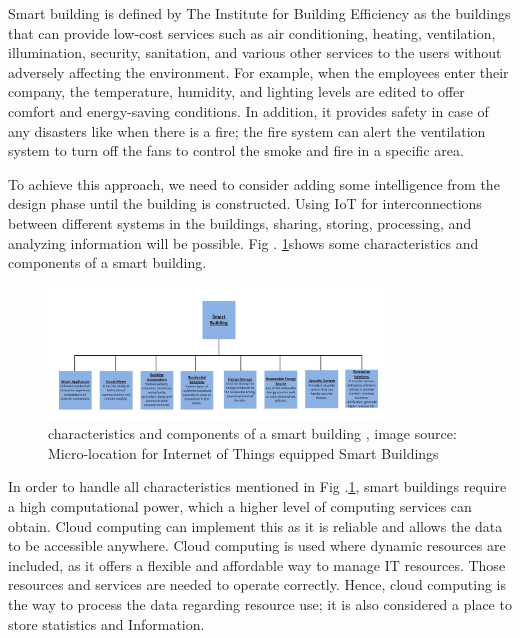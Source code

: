 \documentclass[conference]{IEEEtran}
\begin{document}
Smart building is defined by The Institute for Building Efficiency \cite{smartB} \cite{mic}as the buildings that can provide low-cost services such as air conditioning, heating, ventilation, illumination, security, sanitation, and various other services to the users without adversely affecting the environment\cite{micro}. For example, when the employees enter their company, the temperature, humidity, and lighting levels are edited to offer comfort and energy-saving conditions. In addition, it provides safety in case of any disasters like when there is a fire; the fire system can alert the ventilation system to turn off the fans to control the smoke and fire in a specific area.



To achieve this approach, we need to consider adding some intelligence from the design phase until the building is constructed. Using IoT for interconnections between different systems in the buildings, sharing, storing, processing, and analyzing information will be possible. Fig . \ref{char}shows some characteristics and components
of a smart building. 


\begin{figure}[h!]
	\centering
	\includegraphics[width=3.5in]{charsb.png}
	\caption{\label{char}  characteristics and components
of a smart building
		, image source: Micro-location for Internet of Things equipped
Smart Buildings
		\cite{mic} }
\end{figure}



In order to handle all characteristics mentioned in Fig .\ref{char}, smart buildings require a high computational power, which a higher level of computing services can obtain. Cloud computing can implement this as it is reliable and allows the data to be accessible anywhere. Cloud computing is used where dynamic resources are included, as it offers a flexible and affordable way to manage IT resources. Those resources and services are needed to operate correctly. Hence, cloud computing is the way to process the data regarding resource use; it is also considered a place to store statistics and Information. \cite{frame}
\end{document}
